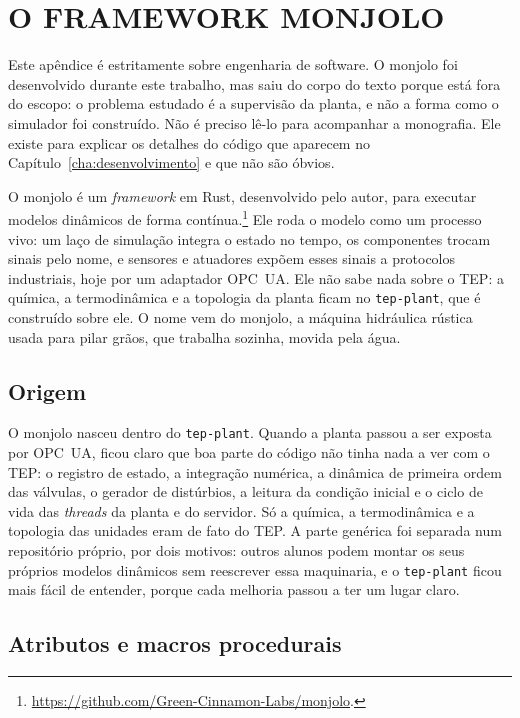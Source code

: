\chapter[O FRAMEWORK MONJOLO]{O FRAMEWORK MONJOLO}
\label{apendice:monjolo}

Este apêndice é estritamente sobre engenharia de software. O monjolo foi desenvolvido durante este trabalho, mas saiu do corpo do texto porque está fora do escopo: o problema estudado é a supervisão da planta, e não a forma como o simulador foi construído. Não é preciso lê-lo para acompanhar a monografia. Ele existe para explicar os detalhes do código que aparecem no Capítulo~\ref{cha:desenvolvimento} e que não são óbvios.

O monjolo é um \textit{framework} em Rust, desenvolvido pelo autor, para executar modelos dinâmicos de forma contínua.\footnote{\url{https://github.com/Green-Cinnamon-Labs/monjolo}.} Ele roda o modelo como um processo vivo: um laço de simulação integra o estado no tempo, os componentes trocam sinais pelo nome, e sensores e atuadores expõem esses sinais a protocolos industriais, hoje por um adaptador OPC~UA. Ele não sabe nada sobre o TEP: a química, a termodinâmica e a topologia da planta ficam no \texttt{tep-plant}, que é construído sobre ele. O nome vem do monjolo, a máquina hidráulica rústica usada para pilar grãos, que trabalha sozinha, movida pela água.

\section{Origem}
\label{apC:origem}

O monjolo nasceu dentro do \texttt{tep-plant}. Quando a planta passou a ser exposta por OPC~UA, ficou claro que boa parte do código não tinha nada a ver com o TEP: o registro de estado, a integração numérica, a dinâmica de primeira ordem das válvulas, o gerador de distúrbios, a leitura da condição inicial e o ciclo de vida das \textit{threads} da planta e do servidor. Só a química, a termodinâmica e a topologia das unidades eram de fato do TEP. A parte genérica foi separada num repositório próprio, por dois motivos: outros alunos podem montar os seus próprios modelos dinâmicos sem reescrever essa maquinaria, e o \texttt{tep-plant} ficou mais fácil de entender, porque cada melhoria passou a ter um lugar claro.

\section{Atributos e macros procedurais}
\label{apC:atributos}

